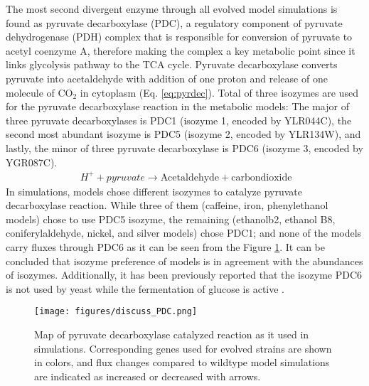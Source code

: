 The most second divergent enzyme through all evolved model simulations is found as pyruvate decarboxylase (PDC), a regulatory component of pyruvate dehydrogenase (PDH) complex that is responsible for conversion of pyruvate to acetyl coenzyme A, therefore making the complex a key metabolic point since it links glycolysis pathway to the TCA cycle. Pyruvate decarboxylase converts pyruvate into acetaldehyde with addition of one proton and release of one molecule of CO$_2$ in cytoplasm (Eq. \ref{eq:pyrdec}). Total of three isozymes are used for the pyruvate decarboxylase reaction in the metabolic models: The major of three pyruvate decarboxylases is PDC1 (isozyme 1, encoded by YLR044C), the second most abundant isozyme is PDC5 (isozyme 2, encoded by YLR134W), and lastly, the minor of three pyruvate decarboxylase is PDC6 (isozyme 3, encoded by YGR087C).
\begin{align}
\label{eq:pyrdec}
\ H^+ + pyruvate \rightarrow \text{Acetaldehyde} + \text{carbondioxide}
\end{align}
In simulations, models chose different isozymes to catalyze pyruvate decarboxylase reaction. While three of them (caffeine,  iron,  phenylethanol models) chose to use PDC5 isozyme, the remaining (ethanolb2, ethanol B8, coniferylaldehyde, nickel, and silver models) chose PDC1; and none of the models carry fluxes through PDC6 as it can be seen from the Figure \ref{fig:discuss_PDC}. It can be concluded that isozyme preference of models is in agreement with the abundances of isozymes. Additionally, it has been previously reported that the isozyme PDC6 is not used by yeast while the fermentation of glucose is active \cite{hohmann1991pdc6}.

\begin{figure}[H]
\texttt{[image: figures/discuss\_PDC.png]}
\caption[Map of pyruvate decarboxylase catalyzed reaction as it used in simulations]{Map of pyruvate decarboxylase catalyzed reaction as it used in simulations. Corresponding genes used for evolved strains are shown in colors, and flux changes compared to wildtype model simulations are indicated as increased or decreased with arrows.}
\label{fig:discuss_PDC}
\end{figure}

